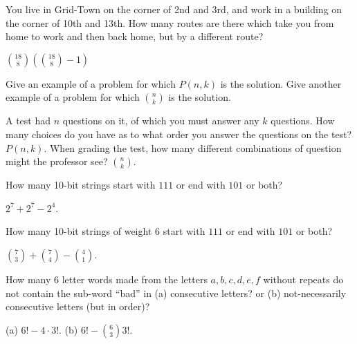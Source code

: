 \begin{questions}
	


\question You live in Grid-Town on the corner of 2nd and 3rd, and work in a building on the corner of 10th and 13th.  How many routes are there which take you from home to work and then back home, but by a different route?

	\begin{answer}
		 ${18 \choose 8}\left({18 \choose 8} - 1\right)$ 
	\end{answer}
	
	


\question Give an example of a problem for which $P(n,k)$ is the solution.  Give another example of a problem for which ${n\choose k}$ is the solution.

	\begin{answer}
		 A test had $n$ questions on it, of which you must answer any $k$ questions.  How many choices do you have as to what order you answer the questions on the test?  $P(n,k)$.  When grading the test, how many different combinations of question might the professor see?  ${n \choose k}$.
	\end{answer}
	
	


%
	
	


\question How many 10-bit strings start with $111$ or end with $101$ or both?

	\begin{answer}
		 $2^7 + 2^7 - 2^4$.
	\end{answer}
	
	


\question How many 10-bit strings of weight 6 start with $111$ or end with $101$ or both?

	\begin{answer}
		${7 \choose 3} + {7 \choose 4} - {4 \choose 1}$.
	\end{answer}
	
	


\question How many 6 letter words made from the letters $a,b,c,d,e,f$ without repeats do not contain the sub-word ``bad'' in (a) consecutive letters? or (b) not-necessarily consecutive letters (but in order)? 

	\begin{answer}
		(a) $6! - 4\cdot 3!$.  (b) $6! - {6 \choose 3}3!$.
	\end{answer}
	

\end{questions}
